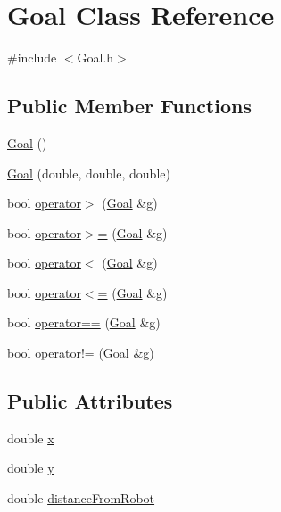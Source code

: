 \hypertarget{classGoal}{\section{\-Goal \-Class \-Reference}
\label{classGoal}
}


{\ttfamily \#include $<$\-Goal.\-h$>$}

\subsection*{\-Public \-Member \-Functions}
\begin{DoxyCompactItemize}
\item 
\hyperlink{classGoal_aef5013c9bf548e51178f58da869d508a}{\-Goal} ()
\item 
\hyperlink{classGoal_a190d96445b05712e4f7449fb7621a4cf}{\-Goal} (double, double, double)
\item 
bool \hyperlink{classGoal_a5379ce3cef229c206bda73319a524b6d}{operator$>$} (\hyperlink{classGoal}{\-Goal} \&g)
\item 
bool \hyperlink{classGoal_abdfff0d10f040e8b913c3ccc0e243d30}{operator$>$=} (\hyperlink{classGoal}{\-Goal} \&g)
\item 
bool \hyperlink{classGoal_a7b24e6fb2bc63837c7b9d06bacc12c92}{operator$<$} (\hyperlink{classGoal}{\-Goal} \&g)
\item 
bool \hyperlink{classGoal_a560a053fd4c5ba5a736bc2c6d6b90851}{operator$<$=} (\hyperlink{classGoal}{\-Goal} \&g)
\item 
bool \hyperlink{classGoal_ada8043a85c61dd68833acdddb4b3cce8}{operator==} (\hyperlink{classGoal}{\-Goal} \&g)
\item 
bool \hyperlink{classGoal_a6e759f1dd1654bbdb779427b63b0a8ac}{operator!=} (\hyperlink{classGoal}{\-Goal} \&g)
\end{DoxyCompactItemize}
\subsection*{\-Public \-Attributes}
\begin{DoxyCompactItemize}
\item 
double \hyperlink{classGoal_af6cd641b328568cc900da4bcc25a9a7a}{x}
\item 
double \hyperlink{classGoal_a12a0a145556d1f773e12a91a4c8ca36d}{y}
\item 
double \hyperlink{classGoal_a5b81dbab33309729a8f8ebc60deb9a15}{distance\-From\-Robot}
\end{DoxyCompactItemize}
